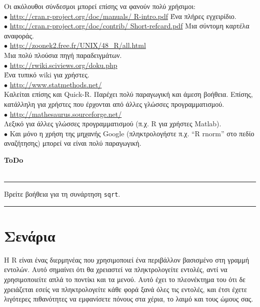 \documentclass[a4paper,10pt,twocolumn]{article}
\newenvironment{ToDo} {
  \begin{flushright}
    \hfill
    \begin{minipage}{0.9\columnwidth}
    \textsf{\textbf{ToDo}} \\
      \vspace{-0.7cm}\\
      {\color{Gray}\rule[-0.05cm]{\columnwidth}{1.5pt}}} {
      {\color{Gray}\rule[0.3cm]{\columnwidth}{1.5pt}}
    \end{minipage}
    \vspace{0.3cm}
  \end{flushright}
  }
\begin{document}
Οι ακόλουθοι σύνδεσμοι μπορεί επίσης να φανούν πολύ χρήσιμοι:\\
\noindent $\bullet$ \url{http://cran.r-project.org/doc/manuals/ R-intro.pdf} Ένα πλήρες εγχειρίδιο.\\
\noindent $\bullet$ \url{http://cran.r-project.org/doc/contrib/ Short-refcard.pdf} Μια σύντομη καρτέλα
αναφοράς.\\
\noindent $\bullet$  \url{http://zoonek2.free.fr/UNIX/48\_R/all.html}\\
Μια πολύ πλούσια πηγή παραδειγμάτων.\\
\noindent $\bullet$  \url{http://rwiki.sciviews.org/doku.php}\\
Ένα τυπικό wiki για χρήστες.\\
\noindent $\bullet$ \url{http://www.statmethods.net/}\\
Καλείται επίσης και Quick-R. Παρέχει πολύ παραγωγική και άμεση βοήθεια. Επίσης, κατάλληλη για χρήστες
που έρχονται από άλλες γλώσσες προγραμματισμού. \\
\noindent $\bullet$ \url{http://mathesaurus.sourceforge.net/}\\
Λεξικό για άλλες γλώσσες προγραμματισμού (π.χ. R για χρήστες Matlab). \\
\noindent $\bullet$  Και μόνο η χρήση της μηχανής Google (πληκτρολογήστε π.χ. ``R rnorm'' στο πεδίο αναζήτησης)
μπορεί να είναι πολύ παραγωγική.\\

\begin{ToDo}
Βρείτε βοήθεια για τη συνάρτηση \texttt{sqrt}.\\
\end{ToDo}


\section{Σενάρια}

Η R είναι ένας διερμηνέας που χρησιμοποιεί ένα περιβάλλον βασισμένο στη γραμμή εντολών. Αυτό σημαίνει
ότι θα χρειαστεί να πληκτρολογείτε εντολές, αντί να χρησιμοποιείτε απλά το ποντίκι και τα μενού. Αυτό έχει
το πλεονέκτημα του ότι δε χρειάζεται εσείς να πληκτρολογείτε κάθε φορά ξανά όλες τις εντολές, και έτσι έχετε
λιγότερες πιθανότητες να εμφανίσετε πόνους στα χέρια, το λαιμό και τους ώμους σας.
\end{document}
